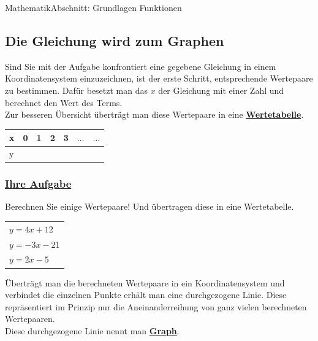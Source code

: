 \documentclass[11pt,twocolumn,oneside,openany,headings=optiontotoc,11pt,numbers=noenddot]{article}
\begin{document}
\begin{worksheet}{}{Mathematik}{Abschnitt: Grundlagen Funktionen}
		\subsection{Die Gleichung wird zum Graphen}
		Sind Sie mit der Aufgabe konfrontiert eine gegebene Gleichung in einem Koordinatensystem einzuzeichnen, ist der erste Schritt, entsprechende Wertepaare zu bestimmen. Dafür besetzt man das \(x\) der Gleichung mit einer Zahl und berechnet den Wert des Terms.\\
		Zur besseren Übersicht überträgt man diese Wertepaare in eine \textbf{\underline{Wertetabelle}}.\\
		\begin{tabularx}{0.45\textwidth}{|X|X|X|X|X|X|X|}
			\hline
			x & 0 & 1 & 2 & 3 & \(\ldots\) & \(\ldots\)\\
			\hline
			y & & & & & & \\
			\hline
		\end{tabularx}
		\subsubsection*{\underline{Ihre Aufgabe}} Berechnen Sie einige Wertepaare! Und übertragen diese in eine Wertetabelle.
		\begin{tabularx}{0.45\textwidth}{X}
			\(y = 4x + 12\)\\
			\(y = -3x - 21\)\\
			\(y = 2x - 5\)
		\end{tabularx}
		\par\bigskip\noindent
		Überträgt man die berechneten Wertepaare in ein Koordinatensystem und verbindet die einzelnen Punkte erhält man eine durchgezogene Linie. Diese repräsentiert im Prinzip nur die Aneinanderreihung von ganz vielen berechneten Wertepaaren.\\
		Diese durchgezogene Linie nennt man \underline{\textbf{Graph}}.

\end{worksheet}
\end{document}
